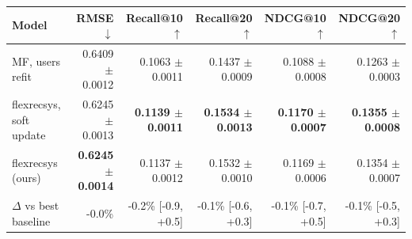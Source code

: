 \begin{tabular}{lrrrrr}
\toprule
Model & RMSE $\downarrow$ & Recall@10 $\uparrow$ & Recall@20 $\uparrow$ & NDCG@10 $\uparrow$ & NDCG@20 $\uparrow$ \\
\midrule
MF, users refit & 0.6409 $\pm$ 0.0012 & 0.1063 $\pm$ 0.0011 & 0.1437 $\pm$ 0.0009 & 0.1088 $\pm$ 0.0008 & 0.1263 $\pm$ 0.0003 \\
flexrecsys, soft update & 0.6245 $\pm$ 0.0013 & \textbf{0.1139 $\pm$ 0.0011} & \textbf{0.1534 $\pm$ 0.0013} & \textbf{0.1170 $\pm$ 0.0007} & \textbf{0.1355 $\pm$ 0.0008} \\
flexrecsys (ours) & \textbf{0.6245 $\pm$ 0.0014} & 0.1137 $\pm$ 0.0012 & 0.1532 $\pm$ 0.0010 & 0.1169 $\pm$ 0.0006 & 0.1354 $\pm$ 0.0007 \\
\midrule
$\Delta$ vs best baseline & -0.0\% & -0.2\% [-0.9, +0.5] & -0.1\% [-0.6, +0.3] & -0.1\% [-0.7, +0.5] & -0.1\% [-0.5, +0.3] \\
\bottomrule
\end{tabular}
